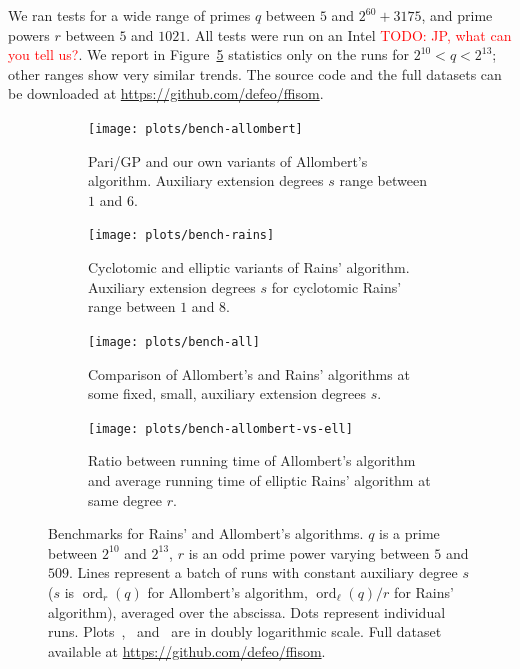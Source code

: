 \documentclass[12pt]{article}
\theoremstyle{plain}
\theoremstyle{definition}
\newcommand{\todo}[1]{\textcolor{red}{TODO: #1}}
\DeclareMathOperator{\order}{ord} %
\newcounter{algorithm}
\begin{document}
We ran tests for a wide range of primes $q$ between $5$ and
$2^{60}+3175$, and prime powers $r$ between $5$ and $1021$. All tests
were run on an Intel \todo{JP, what can you tell us?}. We report in
Figure~\ref{fig:bench} statistics only on the runs for
$2^{10}<q<2^{13}$; other ranges show very similar trends. The source
code and the full datasets can be downloaded at
\url{https://github.com/defeo/ffisom}.



\begin{figure}
  \newlength{\mywidth}
  \setlength{\mywidth}{8cm}
  \centering

  \begin{subfigure}{.48\textwidth}
    \texttt{[image: plots/bench-allombert]}
    \caption{Pari/GP and our own variants of Allombert's algorithm.
      Auxiliary extension degrees $s$ range between $1$ and $6$.}
    \label{fig:bench:allombert}
  \end{subfigure}
  \hfill
  \begin{subfigure}{.48\textwidth}
    \noindent
    \texttt{[image: plots/bench-rains]}
    \caption{Cyclotomic and elliptic variants of Rains' algorithm.
      Auxiliary extension degrees $s$ for cyclotomic Rains' range
      between $1$ and $8$.}
    \label{fig:bench:rains}
  \end{subfigure}
  
  \begin{subfigure}{.48\textwidth}
    \noindent
    \texttt{[image: plots/bench-all]}
    \caption{Comparison of Allombert's and Rains' algorithms at some
      fixed, small, auxiliary extension degrees $s$.}
    \label{fig:bench:all}
  \end{subfigure}
  \hfill
  \begin{subfigure}{.48\textwidth}
    \noindent
    \texttt{[image: plots/bench-allombert-vs-ell]}
    \caption{Ratio between running time of Allombert's algorithm and
      average running time of elliptic Rains' algorithm at same degree
      $r$.}
    \label{fig:bench:allombert-vs-ell}
  \end{subfigure}

  \caption{Benchmarks for Rains' and Allombert's algorithms. $q$ is a
    prime between $2^{10}$ and $2^{13}$, $r$ is an odd prime power varying
    between $5$ and $509$.  Lines represent a batch of runs with
    constant auxiliary degree $s$ ($s$ is $\order_r(q)$ for
    Allombert's algorithm, $\order_\ell(q)/r$ for Rains' algorithm),
    averaged over the abscissa. Dots represent individual runs.
    Plots~,~
    and~ are in doubly logarithmic scale. Full
    dataset available at \url{https://github.com/defeo/ffisom}.}
  \label{fig:bench}
\end{figure}
\end{document}
